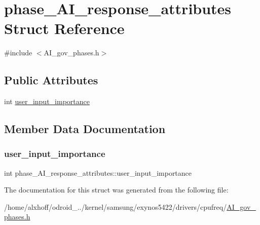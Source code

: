 \hypertarget{structphase__AI__response__attributes}{}\section{phase\+\_\+\+A\+I\+\_\+response\+\_\+attributes Struct Reference}
\label{structphase__AI__response__attributes}


{\ttfamily \#include $<$A\+I\+\_\+gov\+\_\+phases.\+h$>$}

\subsection*{Public Attributes}
\begin{DoxyCompactItemize}
\item 
int \hyperlink{structphase__AI__response__attributes_ad10aa4d1781d5498fcf099274e13dce7}{user\+\_\+input\+\_\+importance}
\end{DoxyCompactItemize}


\subsection{Member Data Documentation}
\mbox{\label{structphase__AI__response__attributes_ad10aa4d1781d5498fcf099274e13dce7}} 
\subsubsection{\texorpdfstring{user\+\_\+input\+\_\+importance}{user\_input\_importance}}
{\footnotesize\ttfamily int phase\+\_\+\+A\+I\+\_\+response\+\_\+attributes\+::user\+\_\+input\+\_\+importance}



The documentation for this struct was generated from the following file\+:\begin{DoxyCompactItemize}
\item 
/home/alxhoff/odroid\+\_../kernel/samsung/exynos5422/drivers/cpufreq/\hyperlink{AI__gov__phases_8h}{A\+I\+\_\+gov\+\_\+phases.\+h}\end{DoxyCompactItemize}
